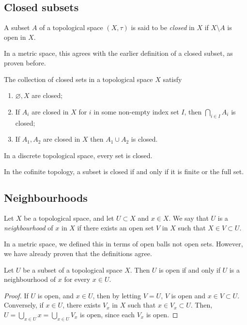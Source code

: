 \subsection{Closed subsets}
\begin{definition}
	A subset \( A \) of a topological space \( (X, \tau) \) is said to be \textit{closed} in \( X \) if \( X \setminus A \) is open in \( X \).
\end{definition}
\begin{remark}
	In a metric space, this agrees with the earlier definition of a closed subset, as proven before.
\end{remark}
\begin{proposition}
	The collection of closed sets in a topological space \( X \) satisfy
	\begin{enumerate}
		\item \( \varnothing, X \) are closed;
		\item If \( A_i \) are closed in \( X \) for \( i \) in some non-empty index set \( I \), then \( \bigcap_{i \in I} A_i \) is closed;
		\item If \( A_1, A_2 \) are closed in \( X \) then \( A_1 \cup A_2 \) is closed.
	\end{enumerate}
\end{proposition}
\begin{example}
	In a discrete topological space, every set is closed.
\end{example}
\begin{example}
	In the cofinite topology, a subset is closed if and only if it is finite or the full set.
\end{example}

\subsection{Neighbourhoods}
\begin{definition}
	Let \( X \) be a topological space, and let \( U \subset X \) and \( x \in X \).
	We say that \( U \) is a \textit{neighbourhood} of \( x \) in \( X \) if there exists an open set \( V \) in \( X \) such that \( X \in V \subset U \).
\end{definition}
\begin{remark}
	In a metric space, we defined this in terms of open balls not open sets.
	However, we have already proven that the definitions agree.
\end{remark}
\begin{proposition}
	Let \( U \) be a subset of a topological space \( X \).
	Then \( U \) is open if and only if \( U \) is a neighbourhood of \( x \) for every \( x \in U \).
\end{proposition}
\begin{proof}
	If \( U \) is open, and \( x \in U \), then by letting \( V = U \), \( V \) is open and \( x \in V \subset U \).
	Conversely, if \( x \in U \), there exists \( V_x \) in \( X \) such that \( x \in V_x \subset U \).
	Then, \( U = \bigcup_{x \in U} x = \bigcup_{x \in U} V_x \) is open, since each \( V_x \) is open.
\end{proof}

